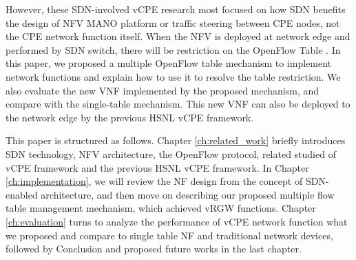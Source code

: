 However, these SDN-involved vCPE research most focused on how SDN benefits the design of NFV MANO \cite{etsi-nfv-mano, etsi-nfv-mano-sdn} platform or traffic steering between CPE nodes, not the CPE network function itself.
When the NFV is deployed at network edge and performed by SDN switch, there will be restriction on the OpenFlow Table \cite{multiple-flow-table}.
In this paper, we proposed a multiple OpenFlow table mechanism to implement network functions and explain how to use it to resolve the table restriction.
We also evaluate the new VNF implemented by the proposed mechanism, and compare with the single-table mechanism.
This new VNF can also be deployed to the network edge by the previous HSNL vCPE framework.

This paper is structured as follows.
Chapter \ref{ch:related_work} briefly introduces SDN technology, NFV architecture, the OpenFlow protocol, related studied of vCPE framework and the previous HSNL vCPE framework.
In Chapter \ref{ch:implementation}, we will review the NF design from the concept of SDN-enabled \cite{sdn-enabled} architecture, and then move on describing our proposed multiple flow table management mechanism, which achieved vRGW functions.
Chapter \ref{ch:evaluation} turns to analyze the performance of vCPE network function what we proposed and compare to single table NF and traditional network devices, followed by Conclusion and proposed future works in the last chapter.
